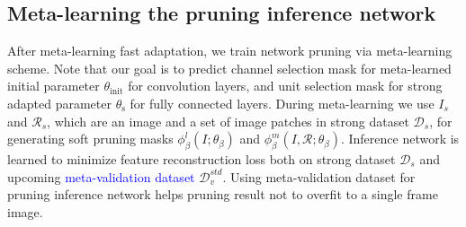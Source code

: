 \documentclass[letterpaper]{article} %
\newcommand{\hyeonwoo}[1]{{\color{red}{HW: #1}}}
\begin{document}


\subsection{Meta-learning the pruning inference network}

After meta-learning fast adaptation, we train network pruning via meta-learning scheme. Note that our goal is to predict channel selection mask for meta-learned initial parameter $\theta_\text{init}$ for convolution layers, and unit selection mask for strong adapted parameter $\theta_\text{s}$ for fully connected layers.
During meta-learning we use $I_s$ and $\mathcal{R}_s$, which are an image and a set of image patches in strong dataset $\mathcal{D}_s$, for generating soft pruning masks $\phi^l_\beta(I;\theta_\beta)$ and $\phi^m_\beta(I,\mathcal{R};\theta_\beta)$.
Inference network is learned to minimize feature reconstruction loss both on strong dataset $\mathcal{D}_s$ and upcoming \textcolor{blue}{meta-validation dataset} $\mathcal{D}_v^{std}$.
Using meta-validation dataset for pruning inference network helps pruning result not to overfit to a single frame image.
\end{document}
